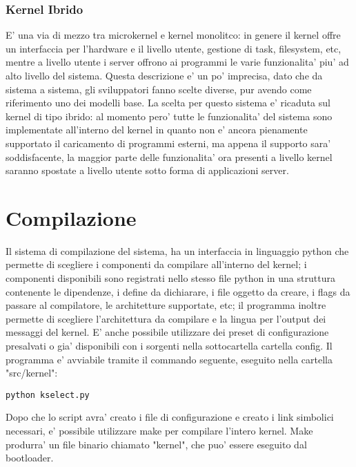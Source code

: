 \documentclass[a4paper,10pt]{book}
\begin{document}
\subsubsection{Kernel Ibrido}
E' una via di mezzo tra microkernel e kernel monolitco: in genere il kernel offre un interfaccia per
l'hardware e il livello utente, gestione di task, filesystem, etc, mentre a livello utente i server 
offrono ai programmi le varie funzionalita' piu' ad alto livello del sistema.
\newline
\newline
\newline
Questa descrizione e' un po' imprecisa, dato che da sistema a sistema, gli sviluppatori fanno scelte diverse,
pur avendo come riferimento uno dei modelli base. La scelta per questo sistema e' ricaduta sul kernel di tipo
ibrido: al momento pero' tutte le funzionalita' del sistema sono implementate all'interno del kernel in quanto
non e' ancora pienamente supportato il caricamento di programmi esterni, ma appena il supporto sara'  soddisfacente,
la maggior parte delle funzionalita' ora presenti a livello kernel saranno spostate a livello utente sotto forma
di applicazioni server.



\section{Compilazione}
Il sistema di compilazione del sistema, ha un interfaccia in linguaggio python che permette di scegliere i 
componenti da compilare all'interno del kernel; i componenti disponibili sono registrati nello stesso file python in una 
struttura contenente le dipendenze, i define da dichiarare, i file oggetto da creare, i flags da passare
al compilatore, le architetture supportate, etc; il programma
inoltre permette di scegliere l'architettura da compilare e la lingua per l'output dei messaggi del kernel. 
E' anche possibile utilizzare dei preset di configurazione presalvati o gia' disponibili con i sorgenti nella
sottocartella cartella config.
Il programma e' avviabile tramite il commando seguente, eseguito nella cartella "src/kernel":

\begin{center}
\texttt{python kselect.py}
\end{center}

Dopo che lo script avra' creato i file di configurazione e creato i link simbolici necessari, e' possibile
utilizzare make per compilare l'intero kernel. Make produrra' un file binario chiamato "kernel", che puo' essere
eseguito dal bootloader.
\end{document}
